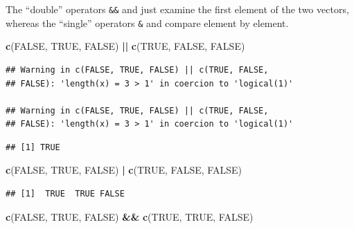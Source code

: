 \documentclass[
]{krantz}
\newenvironment{Shaded}{\begin{snugshade}}{\end{snugshade}}
\newcommand{\KeywordTok}[1]{\textcolor[rgb]{0.13,0.29,0.53}{\textbf{#1}}}
\newcommand{\NormalTok}[1]{#1}
\newcommand{\OperatorTok}[1]{\textcolor[rgb]{0.81,0.36,0.00}{\textbf{#1}}}
\newcommand{\OtherTok}[1]{\textcolor[rgb]{0.56,0.35,0.01}{#1}}
\newcommand{\StringTok}[1]{\textcolor[rgb]{0.31,0.60,0.02}{#1}}
\begin{document}
The ``double'' operators \texttt{\&\&} and \texttt{\textbar{}\textbar{}} just examine the first element of the two vectors, whereas the ``single'' operators \texttt{\&} and \texttt{\textbar{}} compare element by element.

\begin{Shaded}
\begin{Highlighting}[]
\KeywordTok{c}\NormalTok{(}\OtherTok{FALSE}\NormalTok{, }\OtherTok{TRUE}\NormalTok{, }\OtherTok{FALSE}\NormalTok{) }\OperatorTok{||}\StringTok{ }\KeywordTok{c}\NormalTok{(}\OtherTok{TRUE}\NormalTok{, }\OtherTok{FALSE}\NormalTok{, }\OtherTok{FALSE}\NormalTok{)}
\end{Highlighting}
\end{Shaded}

\begin{verbatim}
## Warning in c(FALSE, TRUE, FALSE) || c(TRUE, FALSE,
## FALSE): 'length(x) = 3 > 1' in coercion to 'logical(1)'

## Warning in c(FALSE, TRUE, FALSE) || c(TRUE, FALSE,
## FALSE): 'length(x) = 3 > 1' in coercion to 'logical(1)'
\end{verbatim}

\begin{verbatim}
## [1] TRUE
\end{verbatim}

\begin{Shaded}
\begin{Highlighting}[]
\KeywordTok{c}\NormalTok{(}\OtherTok{FALSE}\NormalTok{, }\OtherTok{TRUE}\NormalTok{, }\OtherTok{FALSE}\NormalTok{) }\OperatorTok{|}\StringTok{ }\KeywordTok{c}\NormalTok{(}\OtherTok{TRUE}\NormalTok{, }\OtherTok{FALSE}\NormalTok{, }\OtherTok{FALSE}\NormalTok{)}
\end{Highlighting}
\end{Shaded}

\begin{verbatim}
## [1]  TRUE  TRUE FALSE
\end{verbatim}

\begin{Shaded}
\begin{Highlighting}[]
\KeywordTok{c}\NormalTok{(}\OtherTok{FALSE}\NormalTok{, }\OtherTok{TRUE}\NormalTok{, }\OtherTok{FALSE}\NormalTok{) }\OperatorTok{\&\&}\StringTok{ }\KeywordTok{c}\NormalTok{(}\OtherTok{TRUE}\NormalTok{, }\OtherTok{TRUE}\NormalTok{, }\OtherTok{FALSE}\NormalTok{)}
\end{Highlighting}
\end{Shaded}
\end{document}

